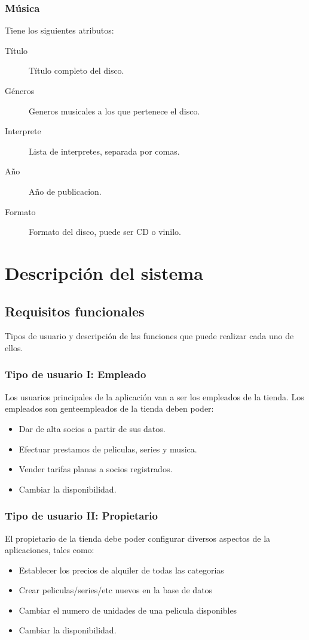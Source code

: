 \documentclass[11pt]{article}
\begin{document}
\subsubsection{Música}
Tiene los siguientes atributos:
\begin{description}
	\item[Título] Título completo del disco.
	\item[Géneros] Generos musicales a los que pertenece el disco.
	\item[Interprete] Lista de interpretes, separada por comas.
	\item[Año] Año de publicacion.
	\item[Formato] Formato del disco, puede ser CD o vinilo.
\end{description}

\section{Descripción del sistema}
\subsection{Requisitos funcionales}
Tipos de usuario y descripción de las funciones que puede realizar cada uno de ellos.

\subsubsection{Tipo de usuario I: Empleado}
Los usuarios principales de la aplicación van a ser los empleados de la tienda. Los empleados son genteempleados de la tienda deben poder:
\begin{itemize}
	\item Dar de alta socios a partir de sus datos.
	\item Efectuar prestamos de peliculas, series y musica.
	\item Vender tarifas planas a socios registrados.
	\item Cambiar la disponibilidad.
\end{itemize}

\subsubsection{Tipo de usuario II: Propietario}
El propietario de la tienda debe poder configurar diversos aspectos de la aplicaciones, tales como:
\begin{itemize}
	\item Establecer los precios de alquiler de todas las categorias
	\item Crear peliculas/series/etc nuevos en la base de datos
	\item Cambiar el numero de unidades de una pelicula disponibles
	\item Cambiar la disponibilidad.
\end{itemize}
\end{document}
